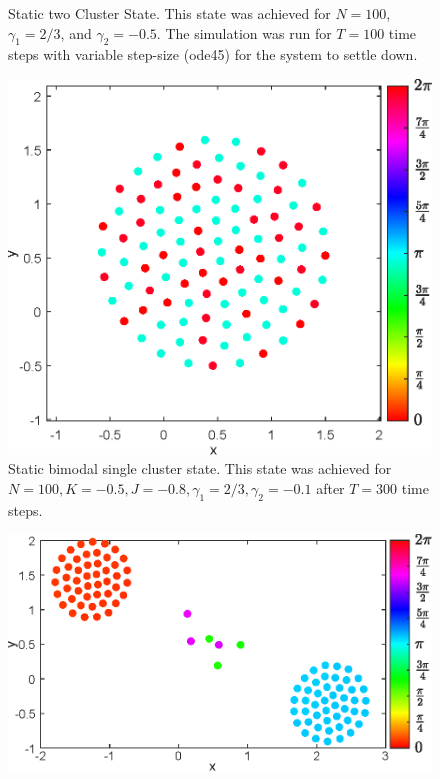 \documentclass[superscriptaddress,reprint,amssymb, amsmath,aps, pre]{revtex4-1}
\begin{document}
{\begin{figure}
        \caption{Static two Cluster State. This state was achieved for \(N = 100\), \(\gamma_1 = 2/3\), and \(\gamma_2 = -0.5\). The simulation was run for \(T = 100\) time steps with variable step-size (ode45) for the system to settle down.}
        \label{fig:static2}
    \end{figure}
    \begin{figure}
        \includegraphics[width = \linewidth]{staticSingleClusterState.eps}
        \caption{Static bimodal single cluster state. This state was achieved for \(N = 100, K = -0.5,J = -0.8,\gamma_1 = 2/3,\gamma_2 = -0.1\) after \(T = 300\) time steps.}
        \label{fig:staticSingleClusterState}
    \end{figure}
    \begin{figure}
        \includegraphics[width = \linewidth]{twoClustersWithR100.eps}

\end{figure}}
\end{document}
